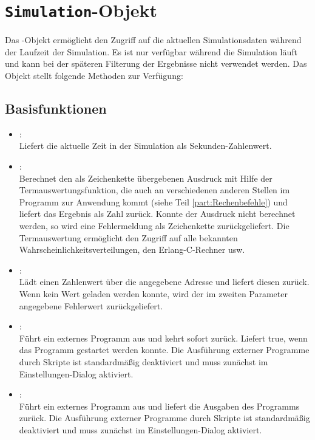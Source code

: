 \chapter{\texttt{Simulation}-Objekt}

Das -Objekt ermöglicht den Zugriff auf die aktuellen Simulationsdaten während
der Laufzeit der Simulation. Es ist nur verfügbar während die Simulation läuft und kann bei der
späteren Filterung der Ergebnisse nicht verwendet werden. Das Objekt stellt folgende Methoden zur Verfügung:

\section{Basisfunktionen}

\begin{itemize}

\item
{}:\\
Liefert die aktuelle Zeit in der Simulation als Sekunden-Zahlenwert.

\item
{}:\\
Berechnet den als Zeichenkette übergebenen Ausdruck mit Hilfe der Termauswertungsfunktion, die
auch an verschiedenen anderen Stellen im Programm zur Anwendung kommt (siehe Teil \ref{part:Rechenbefehle})	
und liefert das Ergebnis als Zahl zurück. Konnte der Ausdruck nicht berechnet werden, so wird eine Fehlermeldung als
Zeichenkette zurückgeliefert. Die Termauswertung ermöglicht den Zugriff auf alle bekannten
Wahrscheinlichkeitsverteilungen, den Erlang-C-Rechner usw.

\item
{}:\\
Lädt einen Zahlenwert über die angegebene Adresse und liefert diesen zurück.
Wenn kein Wert geladen werden konnte, wird der im zweiten Parameter angegebene
Fehlerwert zurückgeliefert.

\item
{}:\\
Führt ein externes Programm aus und kehrt sofort zurück. Liefert true, wenn das Programm gestartet werden konnte.
Die Ausführung externer Programme durch Skripte ist standardmäßig deaktiviert
und muss zunächst im Einstellungen-Dialog aktiviert.

\item
{}:\\
Führt ein externes Programm aus und liefert die Ausgaben des Programms zurück.
Die Ausführung externer Programme durch Skripte ist standardmäßig deaktiviert
und muss zunächst im Einstellungen-Dialog aktiviert.


\end{itemize}
